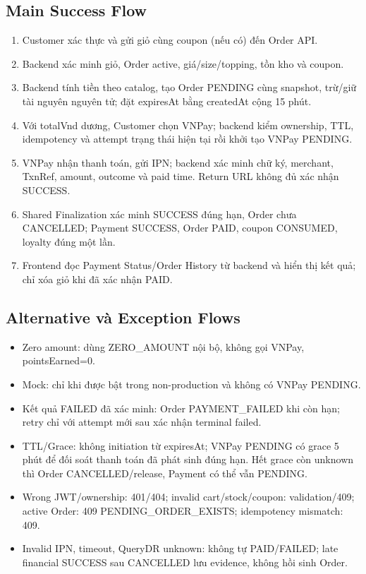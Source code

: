 \subsection{Main Success Flow}
\begin{enumerate}
\item Customer xác thực và gửi giỏ cùng coupon (nếu có) đến Order API.
\item Backend xác minh giỏ, Order active, giá/size/topping, tồn kho và coupon.
\item Backend tính tiền theo catalog, tạo Order PENDING cùng snapshot,
trừ/giữ tài nguyên nguyên tử; đặt expiresAt bằng createdAt cộng 15 phút.
\item Với totalVnd dương, Customer chọn VNPay; backend kiểm ownership,
TTL, idempotency và attempt trạng thái hiện tại rồi khởi tạo VNPay PENDING.
\item VNPay nhận thanh toán, gửi IPN; backend xác minh chữ ký, merchant,
TxnRef, amount, outcome và paid time. Return URL không đủ xác nhận SUCCESS.
\item Shared Finalization xác minh SUCCESS đúng hạn, Order chưa CANCELLED;
Payment SUCCESS, Order PAID, coupon CONSUMED, loyalty đúng một lần.
\item Frontend đọc Payment Status/Order History từ backend và hiển thị
kết quả; chỉ xóa giỏ khi đã xác nhận PAID.
\end{enumerate}

\subsection{Alternative và Exception Flows}
\begin{itemize}
\item Zero amount: dùng ZERO\_AMOUNT nội bộ, không gọi VNPay, pointsEarned=0.
\item Mock: chỉ khi được bật trong non-production và không có VNPay PENDING.
\item Kết quả FAILED đã xác minh: Order PAYMENT\_FAILED khi còn hạn; retry chỉ với attempt
mới sau xác nhận terminal failed.
\item TTL/Grace: không initiation từ expiresAt; VNPay PENDING có grace 5 phút
để đối soát thanh toán đã phát sinh đúng hạn. Hết grace còn unknown thì
Order CANCELLED/release, Payment có thể vẫn PENDING.
\item Wrong JWT/ownership: 401/404; invalid cart/stock/coupon: validation/409;
active Order: 409 PENDING\_ORDER\_EXISTS; idempotency mismatch: 409.
\item Invalid IPN, timeout, QueryDR unknown: không tự PAID/FAILED;
late financial SUCCESS sau CANCELLED lưu evidence, không hồi sinh Order.
\end{itemize}

